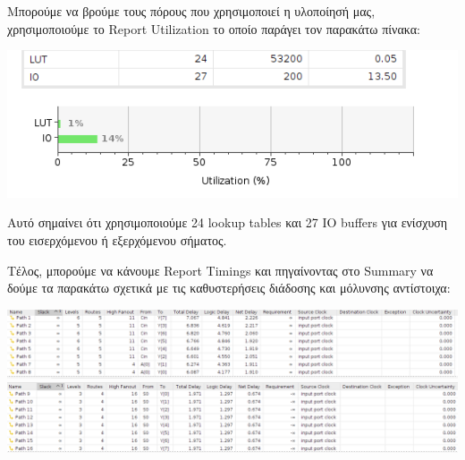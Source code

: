 \documentclass[11pt, a4paper]{report}
\begin{document}
Μπορούμε να βρούμε τους πόρους που χρησιμοποιεί η υλοποίησή μας, χρησιμοποιούμε το Report Utilization το οποίο παράγει τον παρακάτω πίνακα:
\begin{center}
	\includegraphics[width=\textwidth]{./images/alu-1/Utilization.png}
\end{center}

Αυτό σημαίνει ότι χρησιμοποιούμε 24 lookup tables και 27 IO buffers για ενίσχυση του εισερχόμενου ή εξερχόμενου σήματος.

Τέλος, μπορούμε να κάνουμε Report Timings και πηγαίνοντας στο Summary να δούμε τα παρακάτω σχετικά με τις καθυστερήσεις διάδοσης και μόλυνσης αντίστοιχα:
\begin{center}
	\includegraphics[width=\textwidth]{./images/alu-1/Setup_Time_Summury.png}
	\includegraphics[width=\textwidth]{./images/alu-1/Hold_Time_Summury.png}
\end{center}
\end{document}
